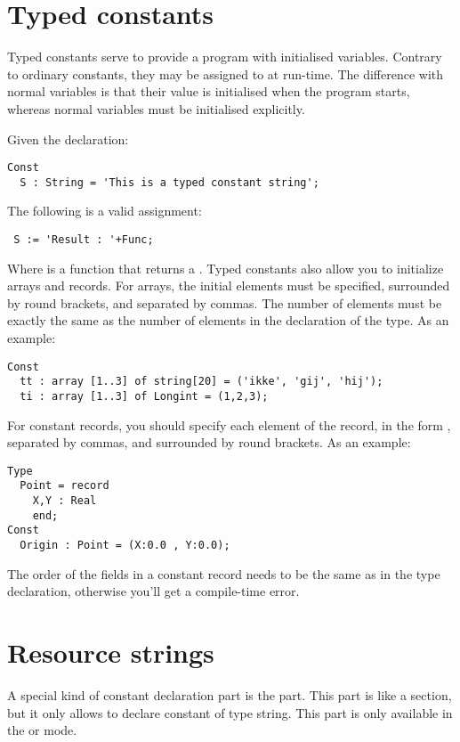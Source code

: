 \documentclass{report}
\begin{document}
\section{Typed constants}
Typed constants serve to provide a program with initialised variables.
Contrary to ordinary constants, they may be assigned to at run-time.
The difference with normal variables is that their value is initialised
when the program starts, whereas normal variables must be initialised
explicitly.

Given the declaration:
\begin{verbatim}
Const
  S : String = 'This is a typed constant string';
\end{verbatim}
The following is a valid assignment:
\begin{verbatim}
 S := 'Result : '+Func;
\end{verbatim}
Where  is a function that returns a .
Typed constants also allow you to initialize arrays and records. For arrays,
the initial elements must be specified, surrounded by round brackets, and
separated by commas. The number of elements must be exactly the same as
the number of elements in the declaration of the type.
As an example:
\begin{verbatim}
Const
  tt : array [1..3] of string[20] = ('ikke', 'gij', 'hij');
  ti : array [1..3] of Longint = (1,2,3);
\end{verbatim}
For constant records, you should specify each element of the record, in the
form , separated by commas, and surrounded by round
brackets.
As an example:
\begin{verbatim}
Type
  Point = record
    X,Y : Real
    end;
Const
  Origin : Point = (X:0.0 , Y:0.0);
\end{verbatim}
The order of the fields in a constant record needs to be the same as in the type declaration,
otherwise you'll get a compile-time error.
\section{Resource strings}
\label{se:resourcestring}
A special kind of constant declaration part is the 
part. This part is like a  section, but it only allows
to declare constant of type string. This part is only available in the
 or  mode.
\end{document}
